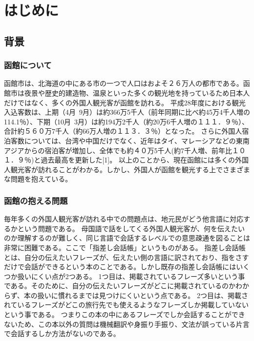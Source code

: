 \documentclass[12pt,papersize]{jsbook}
\begin{document}
\tableofcontents%


\mainmatter%

\chapter{はじめに}

\section{背景}
\subsection{函館について}
 函館市は、北海道の中にある市の一つで人口はおよそ２６万人の都市である。函館市は夜景や歴史的建造物、温泉といった多くの観光地を持っているため日本人だけではなく、多くの外国人観光客が函館を訪れる。
平成28年度における観光入込客数は、上期（4月~9月）は約366万5千人（前年同期に比べ約45万4千人増の114.1％）、下期（10月~3月）は約194万2千人（約20万6千人増の１１１．９％）、合計約５６０万7千人（約66万人増の１１３．３％）となった。
さらに外国人宿泊客数については、台湾や中国だけでなく、近年はタイ、マレーシアなどの東南アジアからの宿泊客が増加し、全体でも約４０万5千人(約7千人増、前年比１０１．９％)と過去最高を更新した[1]。
以上のことから、現在函館には多くの外国人観光客が訪れることがわかる。しかし、外国人が函館を観光する上でさまざまな問題を抱えている。

\subsection{函館の抱える問題}
 毎年多くの外国人観光客が訪れる中での問題点は、地元民がどう他言語に対応するかという問題である。
 母国語で話をしてくる外国人観光客が、何を伝えたいのか理解するのが難しく、同じ言語で会話するレベルでの意思疎通を図ることは非常に困難である。ここで「指差し会話帳」というものがある。
指差し会話帳とは、自分の伝えたいフレーズが、伝えたい側の言語に訳されており、指をさすだけで会話ができるという本のことである。しかし既存の指差し会話帳にはいくつか扱いにくい点が2つある。
1つ目は、掲載されているフレーズ多いという事である。そのために、自分の伝えたいフレーズがどこに掲載されているのかわからず、本の扱いに慣れるまでは見つけにくいという点である。
2つ目は、掲載されているフレーズがどこの旅行先でも使えるようなフレーズしか掲載していないという事である。
つまりこの本の中にあるフレーズでしか会話することができないため、この本以外の質問は機械翻訳や身振り手振り、文法が誤っている片言で会話するしか方法がないのである。
\end{document}
